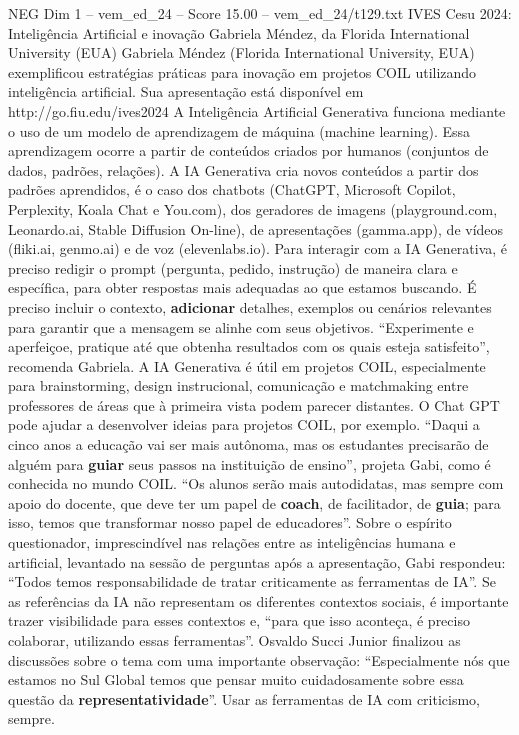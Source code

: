 \begin{textsample}{NEG Dim 1 – vem\_ed\_24 – Score 15.00 – vem\_ed\_24/t129.txt}  \label{ex:f1_neg_135}
IVES Cesu 2024: Inteligência Artificial e inovação Gabriela Méndez, da Florida International University (EUA) Gabriela Méndez (Florida International University, EUA) exemplificou estratégias práticas para inovação em projetos COIL utilizando inteligência artificial.
Sua apresentação está disponível em http://go.fiu.edu/ives2024 A Inteligência Artificial Generativa funciona mediante o uso de um modelo de aprendizagem de máquina (machine learning).
Essa aprendizagem ocorre a partir de conteúdos criados por humanos (conjuntos de dados, padrões, relações).
A IA Generativa cria novos conteúdos a partir dos padrões aprendidos, é o caso dos chatbots (ChatGPT, Microsoft Copilot, Perplexity, Koala Chat e You.com), dos geradores de imagens (playground.com, Leonardo.ai, Stable Diffusion On-line), de apresentações (gamma.app), de vídeos (fliki.ai, genmo.ai) e de voz (elevenlabs.io).
Para interagir com a IA Generativa, é preciso redigir o prompt (pergunta, pedido, instrução) de maneira clara e específica, para obter respostas mais adequadas ao que estamos buscando.
É preciso incluir o contexto, \textbf{adicionar} detalhes, exemplos ou cenários relevantes para garantir que a mensagem se alinhe com seus objetivos. “Experimente e aperfeiçoe, pratique até que obtenha resultados com os quais esteja satisfeito”, recomenda Gabriela.
A IA Generativa é útil em projetos COIL, especialmente para brainstorming, design instrucional, comunicação e matchmaking entre professores de áreas que à primeira vista podem parecer distantes.
O Chat GPT pode ajudar a desenvolver ideias para projetos COIL, por exemplo. “Daqui a cinco anos a educação vai ser mais autônoma, mas os estudantes precisarão de alguém para \textbf{guiar} seus passos na instituição de ensino”, projeta Gabi, como é conhecida no mundo COIL. “Os alunos serão mais autodidatas, mas sempre com apoio do docente, que deve ter um papel de \textbf{coach}, de facilitador, de \textbf{guia}; para isso, temos que transformar nosso papel de educadores”.
Sobre o espírito questionador, imprescindível nas relações entre as inteligências humana e artificial, levantado na sessão de perguntas após a apresentação, Gabi respondeu: “Todos temos responsabilidade de tratar criticamente as ferramentas de IA”.
Se as referências da IA não representam os diferentes contextos sociais, é importante trazer visibilidade para esses contextos e, “para que isso aconteça, é preciso colaborar, utilizando essas ferramentas”.
Osvaldo Succi Junior finalizou as discussões sobre o tema com uma importante observação: “Especialmente nós que estamos no Sul Global temos que pensar muito cuidadosamente sobre essa questão da \textbf{representatividade}”.
Usar as ferramentas de IA com criticismo, sempre.

\end{textsample}
